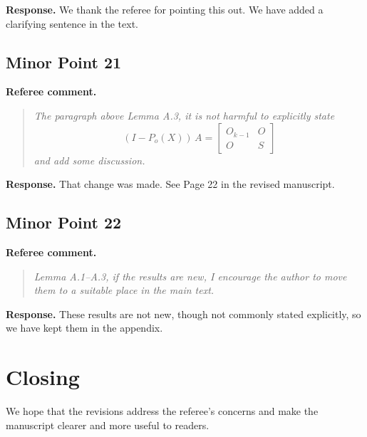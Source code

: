 \documentclass[11pt]{article}
\newenvironment{refereecomment}
{\par\smallskip\noindent\textbf{\color{commentblue}Referee comment.}
\begin{quote}\itshape}
  {
\end{quote}}
\newenvironment{authorresponse}
{\par\smallskip\noindent\textbf{\color{responsegreen}Response.}}
{\par\smallskip}
\begin{document}
\begin{authorresponse}
  We thank the referee for pointing this out. We have added a clarifying sentence in the text.
\end{authorresponse}

\subsection*{Minor Point 21}

\begin{refereecomment}
  The paragraph above Lemma A.3, it is not harmful to explicitly state
  \[
    (I-P_o(X)) \, A =
    \begin{bmatrix}
      O_{k-1} & O \\
      O & S
    \end{bmatrix}
  \]
  and add some discussion.
\end{refereecomment}

\begin{authorresponse}
  That change was made. See Page 22 in the revised manuscript.
\end{authorresponse}

\subsection*{Minor Point 22}

\begin{refereecomment}
  Lemma A.1--A.3, if the results are new, I encourage the author to move them to a suitable place in the main text.
\end{refereecomment}

\begin{authorresponse}
  These results are not new, though not commonly stated explicitly, so we have kept them in the appendix.
\end{authorresponse}

\section*{Closing}

We hope that the revisions address the referee's concerns and make the manuscript clearer and more useful to readers.
\end{document}
